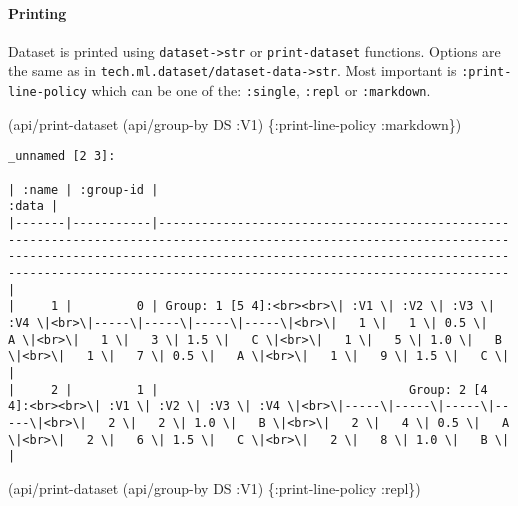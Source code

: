 \documentclass[]{article}
\newenvironment{Shaded}{\begin{snugshade}}{\end{snugshade}}
\newcommand{\AttributeTok}[1]{\textcolor[rgb]{0.77,0.63,0.00}{#1}}
\newcommand{\NormalTok}[1]{#1}
\let\oldparagraph\paragraph
\renewcommand{\paragraph}[1]{\oldparagraph{#1}\mbox{}}
\begin{document}
\hypertarget{printing}{%
\paragraph{Printing}\label{printing}}

Dataset is printed using \texttt{dataset-\textgreater{}str} or
\texttt{print-dataset} functions. Options are the same as in
\texttt{tech.ml.dataset/dataset-data-\textgreater{}str}. Most important
is \texttt{:print-line-policy} which can be one of the:
\texttt{:single}, \texttt{:repl} or \texttt{:markdown}.

\begin{Shaded}
\begin{Highlighting}[]
\NormalTok{(api/print-dataset (api/group-by DS }\AttributeTok{:V1}\NormalTok{) \{}\AttributeTok{:print-line-policy} \AttributeTok{:markdown}\NormalTok{\})}
\end{Highlighting}
\end{Shaded}

\begin{verbatim}
_unnamed [2 3]:

| :name | :group-id |                                                                                                                                                                                                                                                             :data |
|-------|-----------|-------------------------------------------------------------------------------------------------------------------------------------------------------------------------------------------------------------------------------------------------------------------|
|     1 |         0 | Group: 1 [5 4]:<br><br>\| :V1 \| :V2 \| :V3 \| :V4 \|<br>\|-----\|-----\|-----\|-----\|<br>\|   1 \|   1 \| 0.5 \|   A \|<br>\|   1 \|   3 \| 1.5 \|   C \|<br>\|   1 \|   5 \| 1.0 \|   B \|<br>\|   1 \|   7 \| 0.5 \|   A \|<br>\|   1 \|   9 \| 1.5 \|   C \| |
|     2 |         1 |                                   Group: 2 [4 4]:<br><br>\| :V1 \| :V2 \| :V3 \| :V4 \|<br>\|-----\|-----\|-----\|-----\|<br>\|   2 \|   2 \| 1.0 \|   B \|<br>\|   2 \|   4 \| 0.5 \|   A \|<br>\|   2 \|   6 \| 1.5 \|   C \|<br>\|   2 \|   8 \| 1.0 \|   B \| |
\end{verbatim}

\begin{Shaded}
\begin{Highlighting}[]
\NormalTok{(api/print-dataset (api/group-by DS }\AttributeTok{:V1}\NormalTok{) \{}\AttributeTok{:print-line-policy} \AttributeTok{:repl}\NormalTok{\})}
\end{Highlighting}
\end{Shaded}
\end{document}
